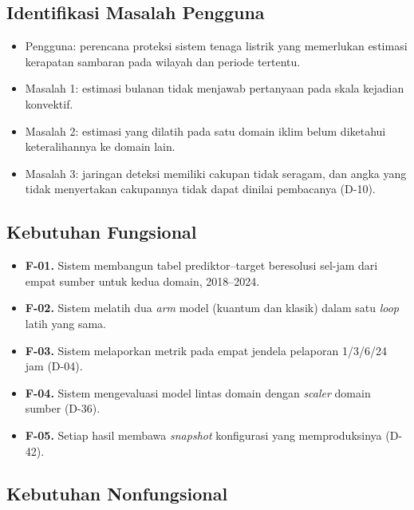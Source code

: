 \subsection{Identifikasi Masalah Pengguna}

\begin{itemize}
    \item Pengguna: perencana proteksi sistem tenaga listrik yang memerlukan
          estimasi kerapatan sambaran pada wilayah dan periode tertentu.
    \item Masalah 1: estimasi bulanan tidak menjawab pertanyaan pada skala
          kejadian konvektif.
    \item Masalah 2: estimasi yang dilatih pada satu domain iklim belum
          diketahui keteralihannya ke domain lain.
    \item Masalah 3: jaringan deteksi memiliki cakupan tidak seragam, dan
          angka yang tidak menyertakan cakupannya tidak dapat dinilai
          pembacanya (D-10).
\end{itemize}

\subsection{Kebutuhan Fungsional}

\begin{itemize}
    \item \textbf{F-01.} Sistem membangun tabel prediktor--target beresolusi
          sel-jam dari empat sumber untuk kedua domain, 2018--2024.
    \item \textbf{F-02.} Sistem melatih dua \textit{arm} model (kuantum dan
          klasik) dalam satu \textit{loop} latih yang sama.
    \item \textbf{F-03.} Sistem melaporkan metrik pada empat jendela pelaporan
          1/3/6/24 jam (D-04).
    \item \textbf{F-04.} Sistem mengevaluasi model lintas domain dengan
          \textit{scaler} domain sumber (D-36).
    \item \textbf{F-05.} Setiap hasil membawa \textit{snapshot} konfigurasi yang
          memproduksinya (D-42).
\end{itemize}

\subsection{Kebutuhan Nonfungsional}

